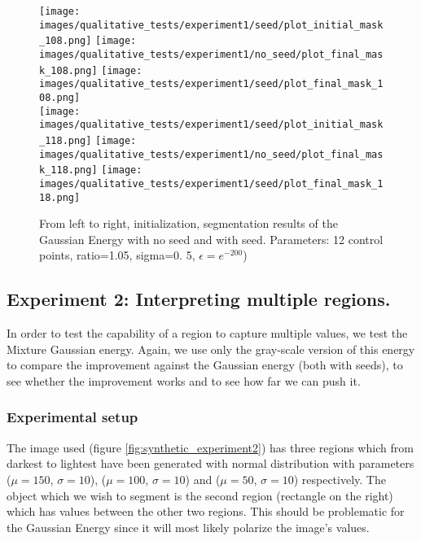\begin{figure}[h!]
	\texttt{[image: images/qualitative\_tests/experiment1/seed/plot\_initial\_mask\_108.png]}\hspace{0.025\textwidth}%
	\texttt{[image: images/qualitative\_tests/experiment1/no\_seed/plot\_final\_mask\_108.png]}\hspace{0.025\textwidth}%
	\texttt{[image: images/qualitative\_tests/experiment1/seed/plot\_final\_mask\_108.png]}\\[0.2em]
	
	\texttt{[image: images/qualitative\_tests/experiment1/seed/plot\_initial\_mask\_118.png]}\hspace{0.025\textwidth}%
	\texttt{[image: images/qualitative\_tests/experiment1/no\_seed/plot\_final\_mask\_118.png]}\hspace{0.025\textwidth}%
	\texttt{[image: images/qualitative\_tests/experiment1/seed/plot\_final\_mask\_118.png]}\\[0.2em]
	\caption{From left to right, initialization, segmentation results of the Gaussian Energy with no seed and with seed. Parameters: 12 control points, ratio=1.05, sigma=0.	5, $\epsilon = e^{-200}$)}
	\label{fig:seed_no_seed}
	\end{figure}

\subsection{Experiment 2: Interpreting multiple regions.}
\label{subsubsec:experiment2}


In order to test the capability of a region to capture multiple values, we test the Mixture Gaussian energy. Again, we use only the gray-scale version of this energy to compare the improvement against the Gaussian energy (both with seeds), to see whether the improvement works and to see how far we can push it. 

\subsubsection{Experimental setup}
The image used (figure \ref{fig:synthetic_experiment2}) has three regions which from darkest to lightest have been generated with normal distribution with parameters ($\mu=150$, $\sigma=10$), ($\mu=100$, $\sigma=10$) and ($\mu=50$, $\sigma=10$) respectively. The object which we wish to segment is the second region (rectangle on the right) which has values between the other two regions. This should be problematic for the Gaussian Energy since it will most likely polarize the image's values. 


